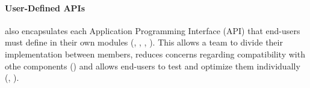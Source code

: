 \paragraph{User-Defined APIs}
\progname{} also encapsulates each Application Programming Interface (API) that
end-users must define in their own modules (, ,
, ). This allows a team to divide their
implementation between members, reduces concerns regarding compatibility with
othe \progname{} components () and allows end-users to test and
optimize them individually (, ).